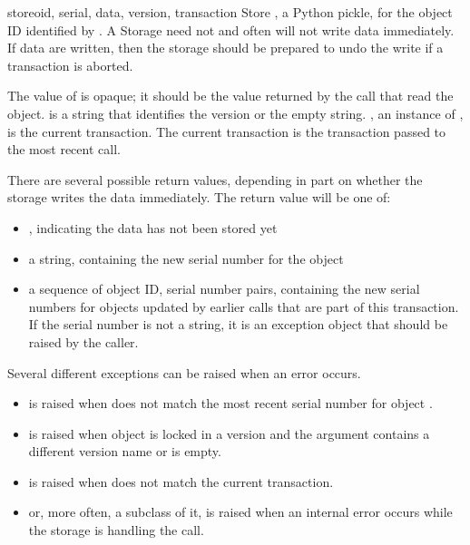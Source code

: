 \documentclass{howto}
\begin{document}
\begin{methoddesc}{store}{oid, serial, data, version, transaction}
  Store , a Python pickle, for the object ID identified by
  .  A Storage need not and often will not write data
  immediately.  If data are written, then the storage should be
  prepared to undo the write if a transaction is aborted.

  The value of  is opaque; it should be the value returned
  by the  call that read the object.   is
  a string that identifies the version or the empty string.
  , an instance of
  , is the current transaction.
  The current transaction is the transaction passed to the most recent
   call.

  There are several possible return values, depending in part on
  whether the storage writes the data immediately.  The return value
  will be one of:

  \begin{itemize}
        \item {}, indicating the data has not been stored yet
        \item a string, containing the new serial number for the
          object
        \item a sequence of object ID, serial number pairs, containing the
          new serial numbers for objects updated by earlier
           calls that are part of this transaction.
          If the serial number is not a string, it is an exception
          object that should be raised by the caller.
  \end{itemize}

  Several different exceptions can be raised when an error occurs.

  \begin{itemize}
        \item {} is raised when 
          does not match the most recent serial number for object
          .

        \item {} is raised when object
           is locked in a version and the 
          argument contains a different version name or is empty.

        \item {} is raised when
           does not match the current transaction.

        \item {} or, more often, a subclass of
          it, is raised when an internal error occurs while the
          storage is handling the  call.
  \end{itemize}
\end{methoddesc}
\end{document}
